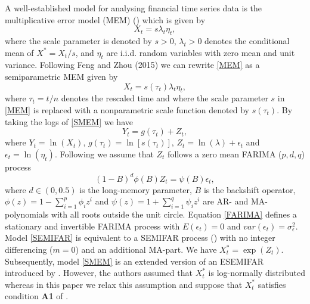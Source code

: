 \documentclass[12pt]{article}
\begin{document}
A well-established model for  analysing financial time series data is the multiplicative error model (MEM) (\cite{engle2002dynamic})  which is given by 
\begin{equation}
\label{MEM}
X_t=s \lambda_t \eta_t,
\end{equation}
where the scale parameter is denoted by $s >0$, $\lambda_t >0$ denotes the conditional mean of $X^*=X_t/s$, and $\eta_t$ are i.i.d. random variables with zero mean and unit variance. Following Feng and Zhou (2015) we can rewrite \eqref{MEM} as a semiparametric MEM given by
\begin{equation}
\label{SMEM}
X_t=s(\tau_t)\lambda_t \eta_t,
\end{equation}   
where $\tau_t=t/n$ denotes the rescaled time and where the scale parameter $s$ in \eqref{MEM} is replaced with a nonparametric scale function denoted by $s(\tau_t)$. 
By taking the logs of \eqref{SMEM} we have
\begin{equation}
\label{SEMIFAR}
Y_t=g(\tau_t) + Z_t,
\end{equation}
where $Y_t=\ln(X_t)$, $g(\tau_t)=\ln[s(\tau_t)]$, $Z_t=\ln(\lambda) + \epsilon_t$ and $\epsilon_t=\ln(\eta_t)$. Following \citet{beran2002semifar} we assume that $Z_t$ follows a zero mean FARIMA ($p, d, q$) process 
\begin{equation}
\label{FARIMA}
(1-B)^d\phi(B)Z_t =\psi(B)\epsilon_t,
\end{equation}
where $d \in (0,0.5)$ is the long-memory parameter, $B$ is the backshift operator, $\phi(z)=1-\sum_{i=1}^{p}\phi_iz^i$ and  $\psi(z)=1+\sum_{i=1}^{q}\psi_iz^i$ are AR- and MA-polynomials with all roots outside the unit circle. Equation \eqref{FARIMA} defines a stationary and invertible FARIMA process with $E(\epsilon_t)=0$ and $var(\epsilon_t)=\sigma^2_{\epsilon}$. Model \eqref{SEMIFAR} is equivalent to a SEMIFAR process (\cite{beran2002semifar}) with no integer differencing ($m=0$) and an additional MA-part. We have $X^*_t = \exp(Z_t)$. Subsequently, model \eqref{SMEM} is an extended version of an ESEMIFAR introduced by \citet{beran2015modelling}. However, the authors assumed that $X^*_t$ is log-normally distributed whereas in this paper we relax this assumption and suppose that $X_t^*$ satisfies condition \textbf{A1} of \citet{feng2020fractionally}.
\end{document}
